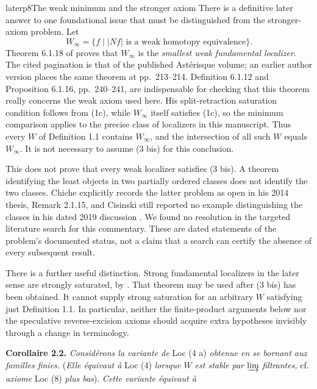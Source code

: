 \begin{dcomment}{later}{p8}{The weak minimum and the stronger axiom}
There is a definitive later answer to one foundational issue that must be distinguished from the stronger-axiom problem. Let
\[
W_\infty=\{f\mid |Nf|\text{ is a weak homotopy equivalence}\}.
\]
Theorem 6.1.18 of \citet[pp.~242--243]{Cisinski2006} proves that $W_\infty$ is the \emph{smallest weak fundamental localizer}. The cited pagination is that of the published Ast\'erisque volume; an earlier author version places the same theorem at pp.~213--214. Definition 6.1.12 and Proposition 6.1.16, pp.~240--241, are indispensable for checking that this theorem really concerns the weak axiom used here. His split-retraction saturation condition follows from (1c), while $W_\infty$ itself satisfies (1c), so the minimum comparison applies to the precise class of localizers in this manuscript. Thus every $W$ of Definition 1.1 contains $W_\infty$, and the intersection of all such $W$ equals $W_\infty$. It is not necessary to assume (3 bis) for this conclusion.

This does not prove that every weak localizer satisfies (3 bis). A theorem identifying the least objects in two partially ordered classes does not identify the two classes. Chiche explicitly records the latter problem as open in his 2014 thesis, Remark 2.1.15, and Cisinski still reported no example distinguishing the classes in his dated 2019 discussion \citep{Chiche2014,Cisinski2019WeakLocalizers}. We found no resolution in the targeted literature search for this commentary. These are dated statements of the problem's documented status, not a claim that a search can certify the absence of every subsequent result.

There is a further useful distinction. Strong fundamental localizers in the later sense are strongly saturated, by \citet[Proposition 4.2.4]{Cisinski2006}. That theorem may be used after (3 bis) has been obtained. It cannot supply strong saturation for an arbitrary $W$ satisfying just Definition 1.1. In particular, neither the finite-product arguments below nor the speculative reverse-excision axioms should acquire extra hypotheses invisibly through a change in terminology.
\end{dcomment}


\textbf{Corollaire 2.2.} \textit{Considérons la variante de} Loc (4 a) \textit{obtenue en se bornant aux familles finies.} (\textit{Elle équivaut à} Loc (4) \textit{lorsque $W$ est stable par} $\varinjlim$ \textit{filtrantes,} cf. \textit{axiome} Loc (8) \textit{plus bas}). \textit{Cette variante équivaut à}

